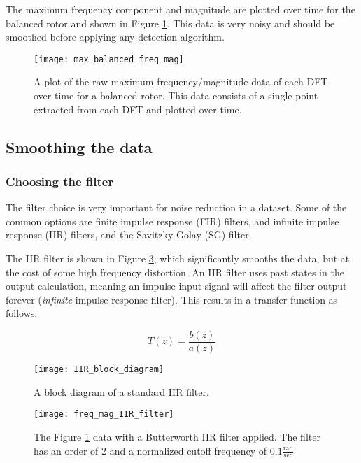 The maximum frequency component and magnitude are plotted over time for the balanced rotor and shown in Figure \ref{fig:max_balanced_freq_mag}.  This data is very noisy and should be smoothed before applying any detection algorithm.


\begin{figure}
	\centering
	\texttt{[image: max\_balanced\_freq\_mag]}
	\decoRule
	\caption{A plot of the raw maximum frequency/magnitude data of each DFT over time for a balanced rotor.  This data consists of a single point extracted from each DFT and plotted over time.}
	\label{fig:max_balanced_freq_mag}
\end{figure}


\subsection{Smoothing the data}
\subsubsection{Choosing the filter}
The filter choice is very important for noise reduction in a dataset.  Some of the common options are finite impulse response (FIR) filters, and infinite impulse response (IIR) filters, and the Savitzky-Golay (SG) filter.

The IIR filter is shown in Figure \ref{fig:freq_mag_IIR_filter}, which significantly smooths the data, but at the cost of some high frequency distortion.  An IIR filter uses past states in the output calculation, meaning an impulse input signal will affect the filter output forever (\textit{infinite} impulse response filter).  This results in a transfer function as follows:

\begin{equation}
	T(z) = \frac{b(z)}{a(z)}
\end{equation}

\begin{figure}
	\centering
	\texttt{[image: IIR\_block\_diagram]}
	\decoRule
	\caption{A block diagram of a standard IIR filter. \cite{wiki:IIR_block_diagram}}
	\label{fig:IIR_block_diagram}
\end{figure}

\begin{figure}
	\centering
	\texttt{[image: freq\_mag\_IIR\_filter]}
	\decoRule
	\caption{The Figure \ref{fig:max_balanced_freq_mag} data with a Butterworth IIR filter applied.  The filter has an order of 2 and a normalized cutoff frequency of $0.1 \mathrm{\frac{rad}{sec}}$}
	\label{fig:freq_mag_IIR_filter}
\end{figure}

